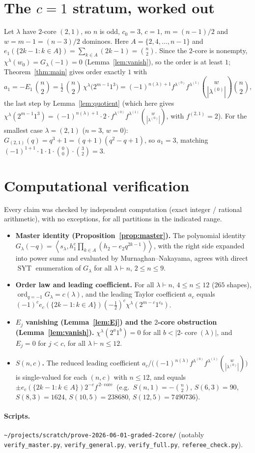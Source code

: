 \documentclass[11pt]{article}
\theoremstyle{definition}
\DeclareMathOperator{\SYT}{SYT}
\DeclareMathOperator{\ord}{ord}
\DeclareMathOperator{\core}{core}
\newcommand{\la}{\lambda}
\newcommand{\inner}[1]{\left\langle #1 \right\rangle}
\begin{document}
\section{The $c=1$ stratum, worked out}

Let $\la$ have $2$-core $(2,1)$, so $n$ is odd, $c_0=3$, $c=1$, $m=(n-1)/2$ and
$w=m-1=(n-3)/2$ dominoes. Here $A=\{2,4,\dots,n-1\}$ and
$e_1(\{2k-1:k\in A\})=\sum_{k\in A}(2k-1)=\binom n2$. Since the $2$-core is nonempty,
$\chi^\la(w_0)=G_\la(-1)=0$ (Lemma~\ref{lem:vanish}), so the order is at least $1$;
Theorem~\ref{thm:main} gives order exactly $1$ with
\[
  a_1=-E_1\,\binom n2=\tfrac12\,\binom n2\,\chi^\la\!\big(2^{m-1}1^{3}\big)
     =(-1)^{n(\la)+1} f^{\la^{(0)}}f^{\la^{(1)}}\binom{w}{|\la^{(0)}|}\binom n2,
\]
the last step by Lemma~\ref{lem:quotient} (which here gives
$\chi^\la(2^{m-1}1^3)=(-1)^{n(\la)+1}\cdot2\cdot
f^{\la^{(0)}}f^{\la^{(1)}}\binom{w}{|\la^{(0)}|}$, with $f^{(2,1)}=2$). For the
smallest case $\la=(2,1)$ ($n=3$, $w=0$): $G_{(2,1)}(q)=q^3+1=(q+1)(q^2-q+1)$, so
$a_1=3$, matching $(-1)^{1+1}\cdot1\cdot1\cdot\binom00\cdot\binom32=3$.

\section{Computational verification}

Every claim was checked by independent computation (exact integer / rational
arithmetic), with no exceptions, for all partitions in the indicated range.
\begin{itemize}
\item \textbf{Master identity (Proposition~\ref{prop:master}).} The polynomial
identity $G_\la(-q)=\inner{s_\la,h_1^e\prod_{k\in A}(h_2-e_2q^{2k-1})}$, with the
right side expanded into power sums and evaluated by Murnaghan--Nakayama, agrees with
direct $\SYT$ enumeration of $G_\la$ for all $\la\vdash n$, $2\le n\le 9$.
\item \textbf{Order law and leading coefficient.} For all $\la\vdash n$,
$4\le n\le 12$ ($265$ shapes), $\ord_{q=-1}G_\la=c(\la)$, and the leading Taylor
coefficient $a_c$ equals
$(-1)^c e_c(\{2k-1:k\in A\})(-\tfrac12)^c\chi^\la(2^{m-c}1^{c_0})$.
\item \textbf{$E_j$ vanishing (Lemma~\ref{lem:Ej}) and the $2$-core obstruction
(Lemma~\ref{lem:vanish}).} $\chi^\la(2^a1^b)=0$ for all $b<|2\text{-}\core(\la)|$, and
$E_j=0$ for $j<c$, for all $\la\vdash n\le 12$.
\item \textbf{$S(n,c)$.} The reduced leading coefficient
$a_c/\big((-1)^{n(\la)}f^{\la^{(0)}}f^{\la^{(1)}}\binom{w}{|\la^{(0)}|}\big)$ is
single-valued for each $(n,c)$ with $n\le12$, and equals
$\pm e_c(\{2k-1:k\in A\})2^{-c}f^{\,2\text{-}\core}$ (e.g.\ $S(n,1)=-\binom n2$,
$S(6,3)=90$, $S(8,3)=1624$, $S(10,5)=238680$, $S(12,5)=7490736$).
\end{itemize}

\paragraph{Scripts.}
\texttt{\~{}/projects/scratch/prove-2026-06-01-graded-2core/} (notably
\texttt{verify\_master.py}, \texttt{verify\_general.py}, \texttt{verify\_full.py},
\texttt{referee\_check.py}).
\end{document}
